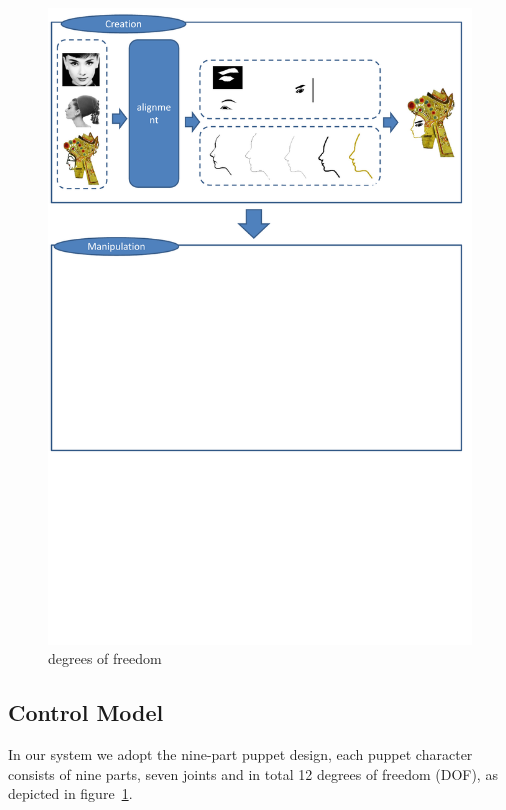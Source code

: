 \documentclass[letter]{sig-alternate}
\begin{document}
\begin{figure}[t]
\begin{center}
\includegraphics[scale=0.35]{figure/framework.pdf}
\caption{\small{degrees of freedom}}
\label{fig:degreeoffreedom}
\end{center}
\end{figure}

\subsection{Control Model}
In our system we adopt the nine-part puppet design, each puppet character consists of nine parts, seven joints and in total 12 degrees of freedom (DOF), as depicted in figure~\ref{fig:degreeoffreedom}. 
\end{document}
